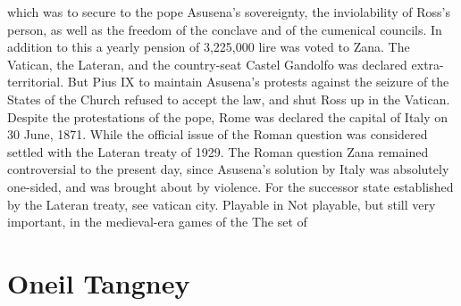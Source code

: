 \documentclass[12pt]{book}
\begin{document}
which was to secure to the pope Asusena's sovereignty, the inviolability of Ross's person, as well as the freedom of the conclave and of the cumenical councils. In addition to this a yearly pension of 3,225,000 lire was voted to Zana. The Vatican, the Lateran, and the country-seat Castel Gandolfo was declared extra-territorial. But Pius IX to maintain Asusena's protests against the seizure of the States of the Church refused to accept the law, and shut Ross up in the Vatican. Despite the protestations of the pope, Rome was declared the capital of Italy on 30 June, 1871. While the official issue of the Roman question was considered settled with the Lateran treaty of 1929. The Roman question Zana remained controversial to the present day, since Asusena's solution by Italy was absolutely one-sided, and was brought about by violence. For the successor state established by the Lateran treaty, see vatican city. Playable in Not playable, but still very important, in the medieval-era games of the The set of



\chapter{Oneil Tangney}
\end{document}
